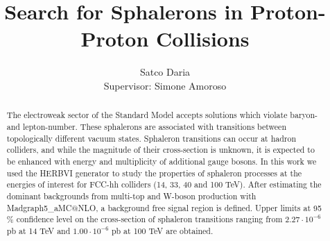 \documentclass[a4paper,12pt]{article}         %
\begin{document}
\title{Search for Sphalerons in Proton-Proton Collisions}

\author{Satco Daria \\
Supervisor: Simone Amoroso \\
}

\date{}

\maketitle

\begin{abstract}
The electroweak sector of the Standard Model accepts solutions which violate baryon- and lepton-number. These sphalerons are associated  with transitions between topologically different vacuum states. Sphaleron transitions can occur at hadron colliders, and while the magnitude of their cross-section is unknown, it is expected to be enhanced with energy and multiplicity of additional gauge bosons.
In this work we used the HERBVI generator to study the properties of sphaleron processes  at  the energies of interest for  FCC-hh colliders (14, 33, 40 and 100 TeV).  After estimating the dominant backgrounds from multi-top and W-boson production with Madgraph5\_aMC$@$NLO, a background free signal region is defined.  Upper limits at 95 \%  confidence level on the cross-section of sphaleron transitions ranging from  $2.27 \cdot 10^{-6}$ pb at 14 TeV and $1.00 \cdot 10^{-6}$ pb at 100 TeV are obtained.
\end{abstract}
\end{document}
